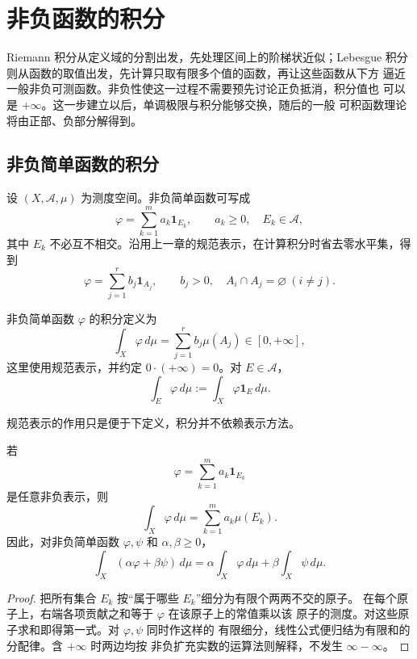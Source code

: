 \chapter{非负函数的积分}
\label{chap:nonnegative-integral}

Riemann 积分从定义域的分割出发，先处理区间上的阶梯状近似；Lebesgue
积分则从函数的取值出发，先计算只取有限多个值的函数，再让这些函数从下方
逼近一般非负可测函数。非负性使这一过程不需要预先讨论正负抵消，积分值也
可以是 \(+\infty\)。这一步建立以后，单调极限与积分能够交换，随后的一般
可积函数理论将由正部、负部分解得到。

\section{非负简单函数的积分}

设 \((X,\mathcal A,\mu)\) 为测度空间。非负简单函数可写成
\[
 \varphi=\sum_{k=1}^{m}a_k\mathbf 1_{E_k},
 \qquad a_k\geq 0,\quad E_k\in\mathcal A,
\]
其中 \(E_k\) 不必互不相交。沿用上一章的规范表示，在计算积分时省去零水平集，得到
\[
 \varphi=\sum_{j=1}^{r}b_j\mathbf 1_{A_j},
 \qquad b_j>0,\quad A_i\cap A_j=\varnothing\ (i\ne j).
\]

\begin{definition}
非负简单函数 \(\varphi\) 的积分定义为
\[
 \int_X\varphi\,d\mu=\sum_{j=1}^{r}b_j\mu(A_j)\in[0,+\infty],
\]
这里使用规范表示，并约定 \(0\cdot(+\infty)=0\)。对 \(E\in\mathcal A\)，
\[
 \int_E\varphi\,d\mu:=\int_X\varphi\mathbf1_E\,d\mu .
\]
\end{definition}

规范表示的作用只是便于下定义，积分并不依赖表示方法。

\begin{proposition}[良定义性与线性]
\label{prop:simple-integral-well-defined}
若
\[
 \varphi=\sum_{k=1}^{m}a_k\mathbf1_{E_k}
\]
是任意非负表示，则
\[
 \int_X\varphi\,d\mu=\sum_{k=1}^{m}a_k\mu(E_k).
\]
因此，对非负简单函数 \(\varphi,\psi\) 和 \(\alpha,\beta\ge0\)，
\[
 \int_X(\alpha\varphi+\beta\psi)\,d\mu
 =\alpha\int_X\varphi\,d\mu+\beta\int_X\psi\,d\mu .
\]
\end{proposition}

\begin{proof}
把所有集合 \(E_k\) 按“属于哪些 \(E_k\)”细分为有限个两两不交的原子。
在每个原子上，右端各项贡献之和等于 \(\varphi\) 在该原子上的常值乘以该
原子的测度。对这些原子求和即得第一式。对 \(\varphi,\psi\) 同时作这样的
有限细分，线性公式便归结为有限和的分配律。含 \(+\infty\) 时两边均按
非负扩充实数的运算法则解释，不发生 \(\infty-\infty\)。
\end{proof}

